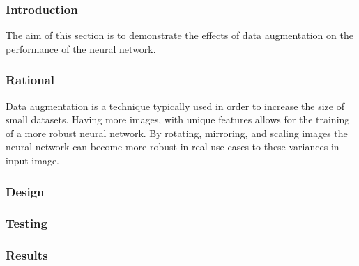 \subsubsection{Introduction}

The aim of this section is to demonstrate the effects of data augmentation on
the performance of the neural network.

\subsubsection{Rational}

Data augmentation is a technique typically used in order to increase the size of
small datasets. Having more images, with unique features allows for the training
of a more robust neural network. By rotating, mirroring, and scaling images the
neural network can become more robust in real use cases to these variances in
input image.

\subsubsection{Design}

\subsubsection{Testing}

\subsubsection{Results}
